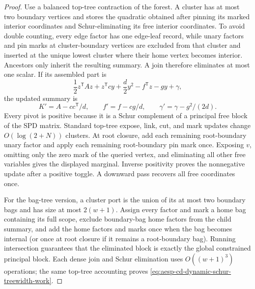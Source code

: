 \begin{proof}
Use a balanced top-tree contraction of the forest.  A cluster has at most two
boundary vertices and stores the quadratic obtained after pinning its marked
interior coordinates and Schur-eliminating its free interior coordinates.
To avoid double counting, every edge factor has one edge-leaf record, while
unary factors and pin marks at cluster-boundary vertices are excluded from
that cluster and inserted at the unique lowest cluster where their home
vertex becomes interior.  Ancestors only inherit the resulting summary.  A
join therefore eliminates at most one scalar.
If its assembled part is
\begin{equation*}
 \frac12z^{\mathsf T}Az+z^{\mathsf T}cy+\frac d2y^2
 -f^{\mathsf T}z-gy+\gamma,
\end{equation*}
the updated summary is
\begin{equation*}
 K'=A-cc^{\mathsf T}/d,\qquad
 f'=f-cg/d,\qquad
 \gamma'=\gamma-g^2/(2d).
\end{equation*}
Every pivot is positive because it is a Schur complement of a principal free
block of the SPD matrix.  Standard top-tree expose, link, cut, and mark
updates change $O(\log(2+N))$ clusters.  At root closure, add each remaining
root-boundary unary factor and apply each remaining root-boundary pin mark
once.  Exposing $v$, omitting only the zero mark of the queried vertex, and
eliminating all other free variables gives the displayed marginal.
Inverse positivity proves the nonnegative update after a positive toggle.  A
downward pass recovers all free coordinates once.

For the bag-tree version, a cluster port is the union of its at most two
boundary bags and has size at most $2(w+1)$.  Assign every factor and mark a
home bag containing its full scope, exclude boundary-bag home factors from
the child summary, and add the home factors and marks once when the bag
becomes internal (or once at root closure if it remains a root-boundary bag).
Running intersection guarantees
that the eliminated block is exactly the global constrained principal block.
Each dense join and Schur elimination uses $O((w+1)^3)$ operations; the same
top-tree accounting proves
\cref{eq:aesp-cd-dynamic-schur-treewidth-work}.
\end{proof}

